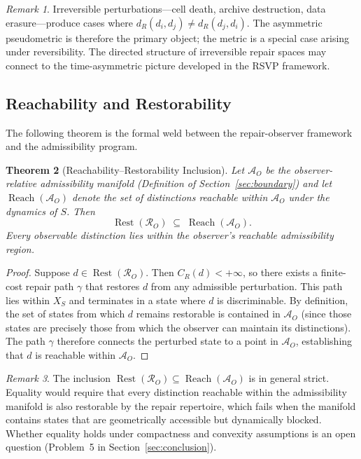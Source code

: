 \documentclass[12pt, oneside]{article}
\theoremstyle{plain}
\newtheorem{theorem}{Theorem}[section]
\theoremstyle{definition}
\theoremstyle{remark}
\newtheorem{remark}[theorem]{Remark}
\theoremstyle{definition}
\DeclareMathOperator{\Rest}{Rest}
\DeclareMathOperator{\Reach}{Reach}
\newcommand{\CR}{C_{\!R}}
\newcommand{\AO}{\mathcal{A}_O}
\newcommand{\Xsub}{X_S}
\begin{document}
\begin{remark}
  Irreversible perturbations---cell death, archive destruction,
  data erasure---produce cases where $d_R(d_i, d_j) \neq d_R(d_j, d_i)$.
  The asymmetric pseudometric is therefore the primary object; the
  metric is a special case arising under reversibility.
  The directed structure of irreversible repair spaces may connect to
  the time-asymmetric picture developed in the RSVP framework.
\end{remark}

\subsection{Reachability and Restorability}

The following theorem is the formal weld between the repair-observer
framework and the admissibility program.

\begin{theorem}[Reachability--Restorability Inclusion]
  Let $\AO$ be the observer-relative admissibility manifold
  (Definition of Section~\ref{sec:boundary}) and let
  $\Reach(\AO)$ denote the set of distinctions reachable
  within $\AO$ under the dynamics of $S$.
  Then
  \[
    \Rest(\mathcal{R}_O)
    \;\subseteq\;
    \Reach(\AO).
  \]
  Every observable distinction lies within the observer's reachable
  admissibility region.
  \label{thm:reach-rest}
\end{theorem}

\begin{proof}
  Suppose $d \in \Rest(\mathcal{R}_O)$.
  Then $\CR(d) < +\infty$, so there exists a finite-cost repair path
  $\gamma$ that restores $d$ from any admissible perturbation.
  This path lies within $\Xsub$ and terminates in a state where $d$
  is discriminable.
  By definition, the set of states from which $d$ remains restorable
  is contained in $\AO$ (since those states are precisely those from
  which the observer can maintain its distinctions).
  The path $\gamma$ therefore connects the perturbed state to a point
  in $\AO$, establishing that $d$ is reachable within $\AO$.
\end{proof}

\begin{remark}
  The inclusion $\Rest(\mathcal{R}_O) \subseteq \Reach(\AO)$ is in
  general strict.
  Equality would require that every distinction reachable within the
  admissibility manifold is also restorable by the repair repertoire,
  which fails when the manifold contains states that are geometrically
  accessible but dynamically blocked.
  Whether equality holds under compactness and convexity assumptions
  is an open question (Problem~5 in Section~\ref{sec:conclusion}).
\end{remark}
\end{document}
